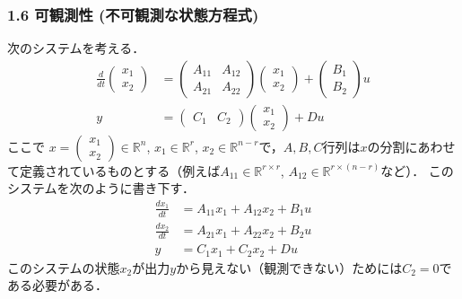 \documentclass[10pt]{beamer}
\begin{document}
\begin{frame}[t]
\frametitle{1.6 可観測性 (不可観測な状態方程式)}
次のシステムを考える．
\begin{align}
 \frac{d}{dt}
  \left(\begin{array}{c}
         {x}_1 \\
   {x}_2
  \end{array}\right)
  &=
  \left(\begin{array}{cc}
         {A}_{11} & {A}_{12} \\
       {A}_{21} & {A}_{22}
  \end{array}\right)
  \left(\begin{array}{c}
         {x}_1 \\
   {x}_2
  \end{array}\right)
  +
  \left(\begin{array}{c}
         {B}_1 \\
   {B}_2
  \end{array}\right)
  u \\
 y &=
  \left(\begin{array}{cc}
         {C}_1 & C_2
  \end{array}\right)
  \left(\begin{array}{c}
         {x}_1 \\
   {x}_2
  \end{array}\right)
  + D u
 
\end{align}
ここで
$x = \left(\begin{array}{c} {x}_1 \\ {x}_2 \end{array}\right) \in {\mathbb R}^n$,
$x_1 \in {\mathbb R}^r$, $x_2 \in {\mathbb R}^{n-r}$で，$A,B,C$行列は$x$の分割にあわせて定義されているものとする（例えば$A_{11} \in {\mathbb R}^{r \times r}$, $A_{12} \in {\mathbb R}^{r \times (n-r)}$など）．
このシステムを次のように書き下す．
\begin{align}
 \frac{dx_1}{dt} &= A_{11} x_1 + A_{12} x_2 + B_1 u
 \\
 \frac{dx_2}{dt} &= A_{21} x_1 + A_{22} x_2 + B_2 u
 \\
 y & = C_1 x_1 + C_2 x_2+ Du

\end{align}
このシステムの状態$x_2$が出力$y$から見えない（観測できない）ためには$C_2=0$である必要がある．
\end{frame}
\end{document}

